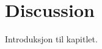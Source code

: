 \documentclass[../../main.tex]{subfiles}
\begin{document}

\chapter{Discussion}


Introduksjon til kapitlet.

\end{document}
